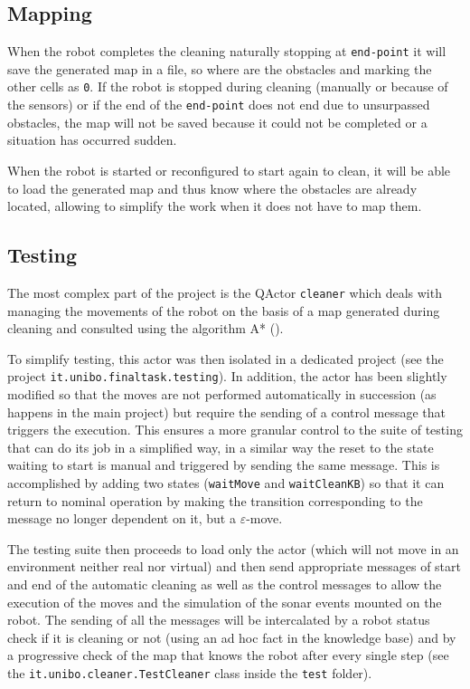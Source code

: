 \subsection{Mapping}
When the robot completes the cleaning naturally stopping at \texttt{end-point} it will save the generated map in a file, so where are the obstacles and marking the other cells as \texttt{0}. If the robot is stopped during cleaning (manually or because of the sensors) or if the end of the \texttt{end-point} does not end due to unsurpassed obstacles, the map will not be saved because it could not be completed or a situation has occurred sudden.

When the robot is started or reconfigured to start again to clean, it will be able to load the generated map and thus know where the obstacles are already located, allowing to simplify the work when it does not have to map them.

\subsection{Testing}
The most complex part of the project is the QActor \texttt{cleaner} which deals with managing the movements of the robot on the basis of a map generated during cleaning and consulted using the algorithm A* ().

To simplify testing, this actor was then isolated in a dedicated project (see the project \texttt{it.unibo.finaltask.testing}). In addition, the actor has been slightly modified so that the moves are not performed automatically in succession (as happens in the main project) but require the sending of a control message that triggers the execution. This ensures a more granular control to the suite of testing that can do its job in a simplified way, in a similar way the reset to the state waiting to start is manual and triggered by sending the same message. This is accomplished by adding two states (\texttt{waitMove} and \texttt{waitCleanKB}) so that it can return to nominal operation by making the transition corresponding to the message no longer dependent on it, but a $\varepsilon$-move.

The testing suite then proceeds to load only the actor (which will not move in an environment neither real nor virtual) and then send appropriate messages of start and end of the automatic cleaning as well as the control messages to allow the execution of the moves and the simulation of the sonar events mounted on the robot. The sending of all the messages will be intercalated by a robot status check if it is cleaning or not (using an ad hoc fact in the knowledge base) and by a progressive check of the map that knows the robot after every single step (see the \texttt{it.unibo.cleaner.TestCleaner} class inside the \texttt{test} folder).

